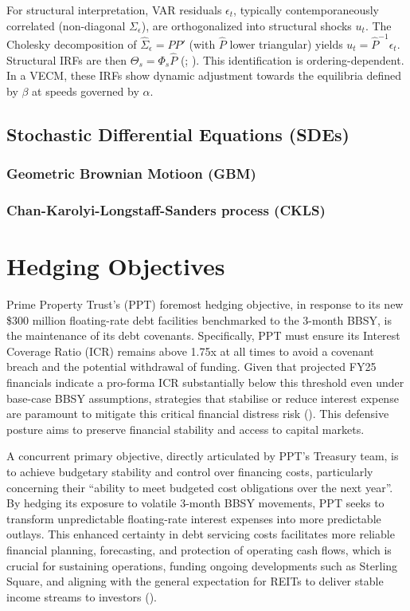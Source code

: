 \documentclass[11pt, a4paper, british]{article}
\begin{document}
For structural interpretation, VAR residuals $\epsilon_t$, typically contemporaneously correlated (non-diagonal $\Sigma_\epsilon$), are orthogonalized into structural shocks $u_t$. The Cholesky decomposition of $\hat{\Sigma}_\epsilon = \hat{P}\hat{P}'$ (with $\hat{P}$ lower triangular) yields $u_t = \hat{P}^{-1}\epsilon_t$. Structural IRFs are then $\Theta_s = \Phi_s \hat{P}$ (\cite{s}; \cite{l}). This identification is ordering-dependent. In a VECM, these IRFs show dynamic adjustment towards the equilibria defined by $\beta$ at speeds governed by $\alpha$.

\newpage

\subsection{Stochastic Differential Equations (SDEs)}

\subsubsection{Geometric Brownian Motioon (GBM)}

\newpage

\subsubsection{Chan-Karolyi-Longstaff-Sanders process (CKLS)}

\newpage

\section{Hedging Objectives}

Prime Property Trust’s (PPT) foremost hedging objective, in response to its new \$300 million floating-rate debt facilities benchmarked to the 3-month BBSY, is the maintenance of its debt covenants. Specifically, PPT must ensure its Interest Coverage Ratio (ICR) remains above 1.75x at all times to avoid a covenant breach and the potential withdrawal of funding. Given that projected FY25 financials indicate a pro-forma ICR substantially below this threshold even under base-case BBSY assumptions, strategies that stabilise or reduce interest expense are paramount to mitigate this critical financial distress risk (\cite{ss}). This defensive posture aims to preserve financial stability and access to capital markets.

A concurrent primary objective, directly articulated by PPT’s Treasury team, is to achieve budgetary stability and control over financing costs, particularly concerning their “ability to meet budgeted cost obligations over the next year”. By hedging its exposure to volatile 3-month BBSY movements, PPT seeks to transform unpredictable floating-rate interest expenses into more predictable outlays. This enhanced certainty in debt servicing costs facilitates more reliable financial planning, forecasting, and protection of operating cash flows, which is crucial for sustaining operations, funding ongoing developments such as Sterling Square, and aligning with the general expectation for REITs to deliver stable income streams to investors (\cite{fss}).
\newpage
\end{document}
